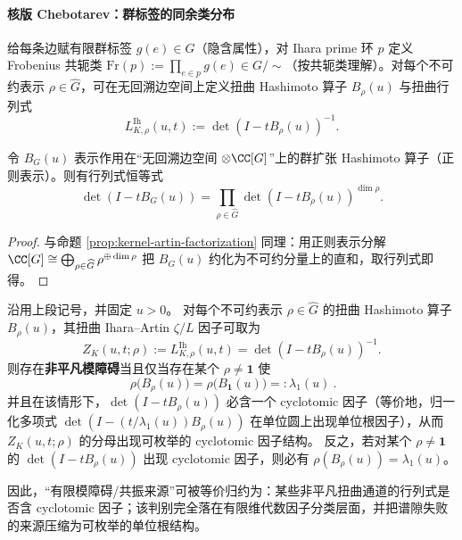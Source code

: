 \paragraph{核版 Chebotarev：群标签的同余类分布}
给每条边赋有限群标签 \(g(e)\in G\)（隐含属性），对 Ihara prime 环 \(p\) 定义 Frobenius 共轭类
\(
\mathrm{Fr}(p):=\prod_{e\in p}g(e)\in G/\!\sim
\)（按共轭类理解）。对每个不可约表示 \(\rho\in\widehat G\)，可在无回溯边空间上定义扭曲 Hashimoto 算子 \(B_{\rho}(u)\) 与扭曲行列式
\[
L^{\mathrm{Ih}}_{K,\rho}(u,t):=\det(I-tB_\rho(u))^{-1}.
\]

\begin{proposition}\label{prop:ihara-artin-factorization}
令 \(B_{G}(u)\) 表示作用在“无回溯边空间 \(\otimes\CC[G]\)”上的群扩张 Hashimoto 算子（正则表示）。则有行列式恒等式
\[
\det(I-tB_{G}(u))=\prod_{\rho\in\widehat G}\det(I-tB_{\rho}(u))^{\dim\rho}.
\]
\end{proposition}

\begin{proof}
与命题 \ref{prop:kernel-artin-factorization} 同理：用正则表示分解
\(
\CC[G]\cong\bigoplus_{\rho\in\widehat G}\rho^{\oplus \dim\rho}
\)
把 \(B_G(u)\) 约化为不可约分量上的直和，取行列式即得。
\end{proof}

\begin{theorem}\label{thm:conclusion75-ihara-cyclotomic-factor-classification}
沿用上段记号，并固定 \(u>0\)。
对每个不可约表示 \(\rho\in\widehat G\) 的扭曲 Hashimoto 算子 \(B_\rho(u)\)，其扭曲 Ihara--Artin \(\zeta/L\) 因子可取为
\[
Z_{K}(u,t;\rho):=L^{\mathrm{Ih}}_{K,\rho}(u,t)=\det(I-tB_\rho(u))^{-1}.
\]
则存在\textbf{非平凡模障碍}当且仅当存在某个 \(\rho\neq\mathbf 1\) 使
\[
\boxed{\ \rho\!\bigl(B_\rho(u)\bigr)=\rho\!\bigl(B_{\mathbf 1}(u)\bigr)=:\lambda_1(u)\ }.
\]
并且在该情形下，\(\det(I-tB_\rho(u))\) 必含一个 cyclotomic 因子（等价地，归一化多项式 \(\det(I-(t/\lambda_1(u))B_\rho(u))\) 在单位圆上出现单位根因子），从而 \(Z_K(u,t;\rho)\) 的分母出现可枚举的 cyclotomic 因子结构。
反之，若对某个 \(\rho\neq\mathbf 1\) 的 \(\det(I-tB_\rho(u))\) 出现 cyclotomic 因子，则必有 \(\rho(B_\rho(u))=\lambda_1(u)\)。
\par
因此，“有限模障碍/共振来源”可被等价归约为：某些非平凡扭曲通道的行列式是否含 cyclotomic 因子；该判别完全落在有限维代数因子分类层面，并把谱隙失败的来源压缩为可枚举的单位根结构。
\end{theorem}

